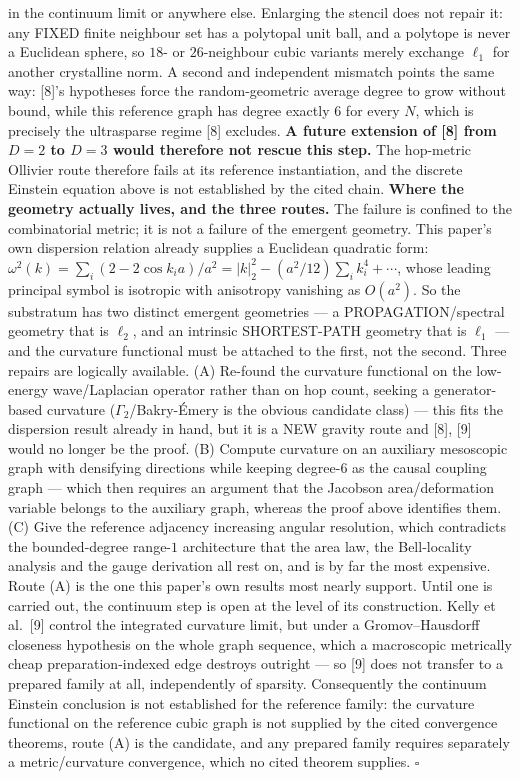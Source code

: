 \documentclass[
]{article}
\begin{document}
in the continuum limit or anywhere else. Enlarging the stencil does not
repair it: any FIXED finite neighbour set has a polytopal unit ball, and
a polytope is never a Euclidean sphere, so \(18\)- or \(26\)-neighbour
cubic variants merely exchange \(\ell_1\) for another crystalline norm.
A second and independent mismatch points the same way: {[}8{]}'s
hypotheses force the random-geometric average degree to grow without
bound, while this reference graph has degree exactly \(6\) for every
\(N\), which is precisely the ultrasparse regime {[}8{]} excludes.
\textbf{A future extension of {[}8{]} from \(D=2\) to \(D=3\) would
therefore not rescue this step.} The hop-metric Ollivier route therefore
fails at its reference instantiation, and the discrete Einstein equation
above is not established by the cited chain. \textbf{Where the geometry
actually lives, and the three routes.} The failure is confined to the
combinatorial metric; it is not a failure of the emergent geometry. This
paper's own dispersion relation already supplies a Euclidean quadratic
form:
\(\omega^2(k)=\sum_i (2-2\cos k_ia)/a^2 = |k|_2^2 - (a^2/12)\sum_i k_i^4+\cdots\),
whose leading principal symbol is isotropic with anisotropy vanishing as
\(O(a^2)\). So the substratum has two distinct emergent geometries --- a
PROPAGATION/spectral geometry that is \(\ell_2\), and an intrinsic
SHORTEST-PATH geometry that is \(\ell_1\) --- and the curvature
functional must be attached to the first, not the second. Three repairs
are logically available. (A) Re-found the curvature functional on the
low-energy wave/Laplacian operator rather than on hop count, seeking a
generator-based curvature (\(\Gamma_2\)/Bakry-Émery is the obvious
candidate class) --- this fits the dispersion result already in hand,
but it is a NEW gravity route and {[}8{]}, {[}9{]} would no longer be
the proof. (B) Compute curvature on an auxiliary mesoscopic graph with
densifying directions while keeping degree-\(6\) as the causal coupling
graph --- which then requires an argument that the Jacobson
area/deformation variable belongs to the auxiliary graph, whereas the
proof above identifies them. (C) Give the reference adjacency increasing
angular resolution, which contradicts the bounded-degree range-\(1\)
architecture that the area law, the Bell-locality analysis and the gauge
derivation all rest on, and is by far the most expensive. Route (A) is
the one this paper's own results most nearly support. Until one is
carried out, the continuum step is open at the level of its
construction. Kelly et al.~{[}9{]} control the integrated curvature
limit, but under a Gromov--Hausdorff closeness hypothesis on the whole
graph sequence, which a macroscopic metrically cheap preparation-indexed
edge destroys outright --- so {[}9{]} does not transfer to a prepared
family at all, independently of sparsity. Consequently the continuum
Einstein conclusion is not established for the reference family: the
curvature functional on the reference cubic graph is not supplied by the
cited convergence theorems, route (A) is the candidate, and any prepared
family requires separately a metric/curvature convergence, which no
cited theorem supplies. \(\square\)
\end{document}
